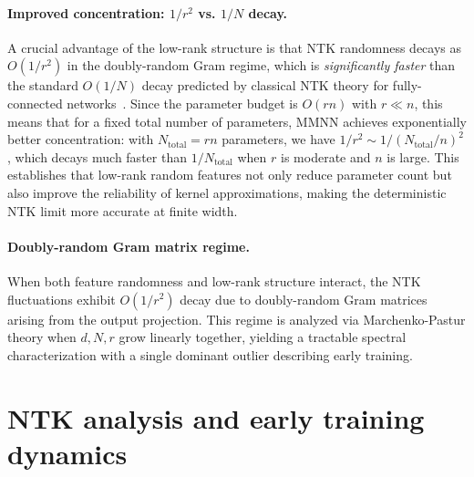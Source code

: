 \documentclass{article}
\begin{document}
\paragraph{Improved concentration: \( 1/r^2 \) vs. \( 1/N \) decay.}
A crucial advantage of the low-rank structure is that NTK randomness decays as \( O(1/r^2) \) in the doubly-random Gram regime, which is \emph{significantly faster} than the standard \( O(1/N) \) decay predicted by classical NTK theory for fully-connected networks~\cite{jacot2018neural,arora2019exact}. Since the parameter budget is \( O(rn) \) with \( r \ll n \), this means that for a fixed total number of parameters, MMNN achieves exponentially better concentration: with \( N_{\text{total}} = rn \) parameters, we have \( 1/r^2 \sim 1/(N_{\text{total}}/n)^2 \), which decays much faster than \( 1/N_{\text{total}} \) when \( r \) is moderate and \( n \) is large. This establishes that low-rank random features not only reduce parameter count but also improve the reliability of kernel approximations, making the deterministic NTK limit more accurate at finite width.

\paragraph{Doubly-random Gram matrix regime.}
When both feature randomness and low-rank structure interact, the NTK fluctuations exhibit \( O(1/r^2) \) decay due to doubly-random Gram matrices arising from the output projection. This regime is analyzed via Marchenko-Pastur theory when \( d, N, r \) grow linearly together, yielding a tractable spectral characterization with a single dominant outlier describing early training.

\vspace{2em}
\section{NTK analysis and early training dynamics}

\vspace{1em}
\end{document}
